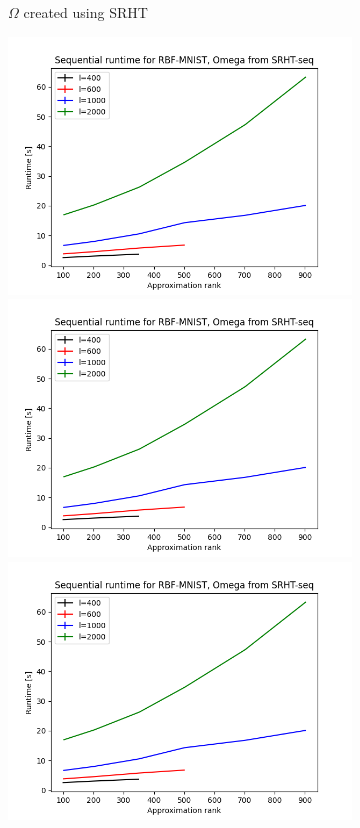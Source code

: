 \documentclass{article}
\theoremstyle{definition}
\begin{document}
\begin{figure}
\begin{subfigure}[t]{\textwidth+20pt\relax}
    \caption{$\Omega$ created using SRHT}
\end{subfigure}\hfill
\begin{subfigure}[t]{0.35\textwidth}
    \includegraphics[width=\textwidth]{plots/runtime_new/runtime_RBF-MNIST_SRHT-seq.png}
    \includegraphics[width=\textwidth]{plots/runtime_new/runtime_RBF-MNIST_SRHT-seq.png}
    \includegraphics[width=\textwidth]{plots/runtime_new/runtime_RBF-MNIST_SRHT-seq.png}

\end{subfigure}
\end{figure}
\end{document}
